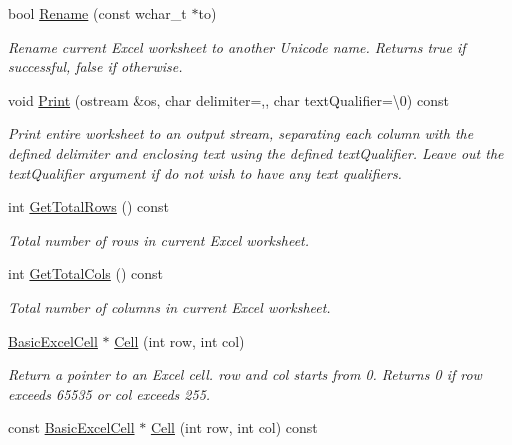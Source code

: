 \begin{DoxyCompactItemize}
bool \hyperlink{class_y_excel_1_1_basic_excel_worksheet_aae84dfe5dc5bc2c52267e4c4ed46714a}{Rename} (const wchar\+\_\+t $\ast$to)
\begin{DoxyCompactList}\small\item\em Rename current Excel worksheet to another Unicode name. Returns true if successful, false if otherwise. \end{DoxyCompactList}\item 
void \hyperlink{class_y_excel_1_1_basic_excel_worksheet_ac6b8ceafcbcf0b8a85962fe13bbb88ee}{Print} (ostream \&os, char delimiter=\textquotesingle{},\textquotesingle{}, char text\+Qualifier=\textquotesingle{}\textbackslash{}0\textquotesingle{}) const 
\begin{DoxyCompactList}\small\item\em Print entire worksheet to an output stream, separating each column with the defined delimiter and enclosing text using the defined text\+Qualifier. Leave out the text\+Qualifier argument if do not wish to have any text qualifiers. \end{DoxyCompactList}\item 
int \hyperlink{class_y_excel_1_1_basic_excel_worksheet_a8dce97605c50fecefe3bed6a85898721}{Get\+Total\+Rows} () const 
\begin{DoxyCompactList}\small\item\em Total number of rows in current Excel worksheet. \end{DoxyCompactList}\item 
int \hyperlink{class_y_excel_1_1_basic_excel_worksheet_a76ba86b19cb3325f8e0d15fd5be03d34}{Get\+Total\+Cols} () const 
\begin{DoxyCompactList}\small\item\em Total number of columns in current Excel worksheet. \end{DoxyCompactList}\item 
\hyperlink{class_y_excel_1_1_basic_excel_cell}{Basic\+Excel\+Cell} $\ast$ \hyperlink{class_y_excel_1_1_basic_excel_worksheet_a8fb39f8d5f883e4946af0f5457ae40df}{Cell} (int row, int col)
\begin{DoxyCompactList}\small\item\em Return a pointer to an Excel cell. row and col starts from 0. Returns 0 if row exceeds 65535 or col exceeds 255. \end{DoxyCompactList}\item 
const \hyperlink{class_y_excel_1_1_basic_excel_cell}{Basic\+Excel\+Cell} $\ast$ \hyperlink{class_y_excel_1_1_basic_excel_worksheet_ad89a01db18182eb40ecdef1ca4bd52fb}{Cell} (int row, int col) const 

\end{DoxyCompactItemize}
